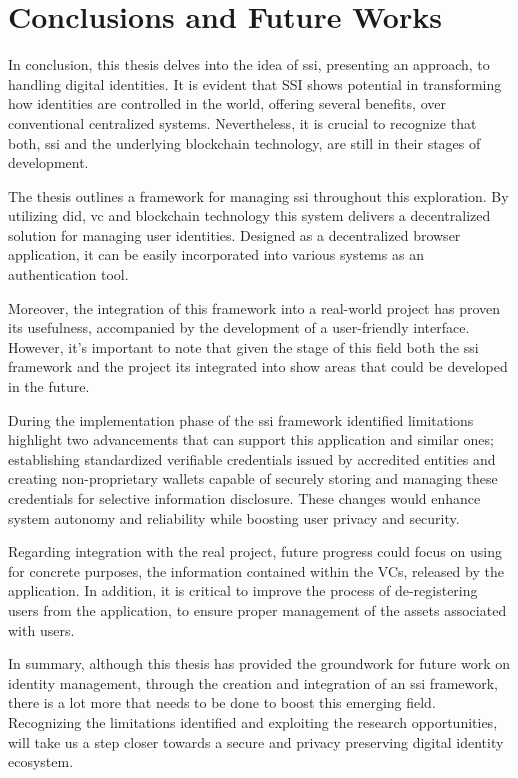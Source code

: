 \chapter{Conclusions and Future Works} \label{ch:conclusions}

In conclusion, this thesis delves into the idea of \acrfull{ssi}, presenting an approach, to handling digital identities. It is evident that SSI shows 
potential in transforming how identities are controlled in the world, offering several benefits, over conventional centralized systems. Nevertheless, it is crucial to 
recognize that both, \gls{ssi} and the underlying blockchain technology, are still in their stages of development.

The thesis outlines a framework for managing \gls{ssi} throughout this exploration. By utilizing \acrfull{did}, \acrfull{vc} and blockchain technology this system delivers a decentralized 
solution for managing user identities. Designed as a decentralized browser application, it can be easily incorporated into various systems as an authentication tool.

Moreover, the integration of this framework into a real-world project has proven its usefulness, accompanied by the development of a user-friendly interface. However, it's 
important to note that given the stage of this field both the \gls{ssi} framework and the project its integrated into show areas that could be developed in the future. 

During the implementation phase of the \gls{ssi} framework identified limitations highlight two advancements that can support this application and similar ones; establishing 
standardized verifiable credentials issued by accredited entities and creating non-proprietary wallets capable of securely storing and managing these credentials for 
selective information disclosure. These changes would enhance system autonomy and reliability while boosting user privacy and security.

Regarding integration with the real project, future progress could focus on using for concrete purposes, the information contained within the VCs, released by the 
application. In addition, it is critical to improve the process of de-registering users from the application, to ensure proper management of the assets associated with users.

In summary, although this thesis has provided the groundwork for future work on identity management, through the creation and integration of an \gls{ssi} framework, there is a 
lot more that needs to be done to boost this emerging field. Recognizing the limitations identified and exploiting the research opportunities, will take us a step closer 
towards a secure and privacy preserving digital identity ecosystem. 
